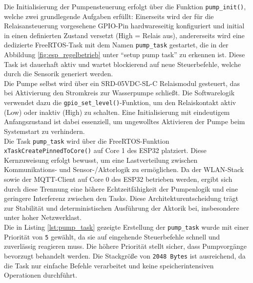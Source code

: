 Die Initialisierung der Pumpensteuerung erfolgt über die Funktion \texttt{pump\_init()}, welche zwei grundlegende Aufgaben erfüllt: Einerseits wird der für die Relaisansteuerung vorgesehene GPIO-Pin hardwareseitig konfiguriert und initial in einen definierten Zustand versetzt (High = Relais aus), andererseits wird eine dedizierte FreeRTOS-Task mit dem Namen \texttt{pump\_task} gestartet, die in der Abbildung \vref{fig:esp_regelbetrieb} unter \enquote{setup pump task} zu erkennen ist. Diese Task ist dauerhaft aktiv und wartet blockierend auf neue Steuerbefehle, welche durch die Sensorik generiert werden.
\\
Die Pumpe selbst wird über ein SRD-05VDC-SL-C Relaismodul gesteuert, das bei Aktivierung den Stromkreis zur Wasserpumpe schließt. Die Softwarelogik verwendet dazu die \texttt{gpio\_set\_level()}-Funktion, um den Relaiskontakt aktiv (Low) oder inaktiv (High) zu schalten. Eine Initialisierung mit eindeutigem Anfangszustand ist dabei essenziell, um ungewolltes Aktivieren der Pumpe beim Systemstart zu verhindern.
\\
Die Task \texttt{pump\_task} wird über die FreeRTOS-Funktion \texttt{xTaskCreatePinnedToCore()} auf Core 1 des ESP32 platziert. Diese Kernzuweisung erfolgt bewusst, um eine Lastverteilung zwischen Kommunikations- und Sensor-/Aktorlogik zu ermöglichen. Da der WLAN-Stack sowie der MQTT-Client auf Core 0 des ESP32 betrieben werden, ergibt sich durch diese Trennung eine höhere Echtzeitfähigkeit der Pumpenlogik und eine geringere Interferenz zwischen den Tasks. Diese Architekturentscheidung trägt zur Stabilität und deterministischen Ausführung der Aktorik bei, insbesondere unter hoher Netzwerklast. 
\\
Die in Listing \vref{lst:pump_task} gezeigte Erstellung der \texttt{pump\_task} wurde mit einer Priorität von \texttt{5} gewählt, da sie auf eingehende Steuerbefehle schnell und zuverlässig reagieren muss. Die höhere Priorität stellt sicher, dass Pumpvorgänge bevorzugt behandelt werden. Die Stackgröße von \texttt{2048 Bytes} ist ausreichend, da die Task nur einfache Befehle verarbeitet und keine speicherintensiven Operationen durchführt.
\newpage

